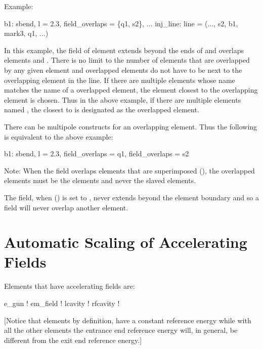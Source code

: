 Example:
\begin{example}
  b1: sbend, l = 2.3, field_overlaps = \{q1, s2\}, ...
  inj_line: line = (..., s2, b1, mark3, q1, ...)
\end{example}
In this example, the field of element  extends beyond the ends of  and overlaps
elements  and . There is no limit to the number of elements that are overlapped by any
given element and overlapped elements do not have to be next to the overlapping element in the
line. If there are multiple elements whose name matches the name of a overlapped element, the
element closest to the overlapping element is chosen. Thus in the above example, if there are
multiple elements named , the closest  to  is designated as the overlapped
element.

There can be multipole  constructs for an overlapping element.
Thus the following is equivalent to the above example:
\begin{example}
  b1: sbend, l = 2.3, field_overlaps = q1, field_overlaps = s2
\end{example}

Note: When the field overlaps elements that are superimposed (), the overlapped 
elements must be the  elements and never the slaved elements.

The field, when  () is set to , never extends beyond
the element boundary and so a  field will never overlap another element.

\section{Automatic Scaling of Accelerating Fields}
\label{s:autoscale}

Elements that have accelerating fields are:
\begin{example}
  e_gun       ! 
  em_field    ! 
  lcavity     ! 
  rfcavity    ! 
\end{example}
[Notice that  elements by definition, have a constant reference energy while with all
the other elements the entrance end reference energy will, in general, be different from the exit
end reference energy.]

